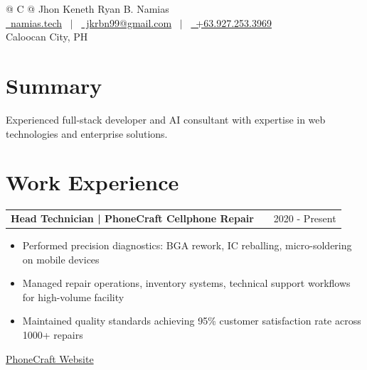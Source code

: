 \documentclass[a4paper,12pt]{article}
\makeatletter
\newenvironment{joblong}[2]
    {
    \begin{tabularx}{\linewidth}{@{}l X r@{}}
    \textbf{#1} & \hfill &  #2 \\[3.75pt]
    \end{tabularx}
    \begin{minipage}[t]{\linewidth}
    \begin{itemize}[nosep,after=\strut, leftmargin=1em, itemsep=3pt,label=--]
    }
    {
    \end{itemize}
    \end{minipage}    
    }
\makeatother
\begin{document}
\pagestyle{empty} 



\begin{tabularx}{\linewidth}{@{} C @{}}
\Huge{Jhon Keneth Ryan B. Namias} \\[7.5pt]
\href{https://namias.tech/}{\raisebox{-0.05\height}\faGlobe \ namias.tech} \ $|$ \ 
\href{mailto:jkrbn99@gmail.com}{\raisebox{-0.05\height}\faEnvelope \ jkrbn99@gmail.com} \ $|$ \ 
\href{tel:+639272533969}{\raisebox{-0.05\height}\faMobile \ +63.927.253.3969} \\
Caloocan City, PH \\
\end{tabularx}


\section{Summary}
Experienced full-stack developer and AI consultant with expertise in web technologies and enterprise solutions.

\section{Work Experience}

\begin{joblong}{Head Technician | PhoneCraft Cellphone Repair}{2020 - Present}
\item Performed precision diagnostics: BGA rework, IC reballing, micro-soldering on mobile devices
\item Managed repair operations, inventory systems, technical support workflows for high-volume facility
\item Maintained quality standards achieving 95\% customer satisfaction rate across 1000+ repairs
\end{joblong}
\href{https://phonecraft.vercel.app/}{PhoneCraft Website}
\end{document}
